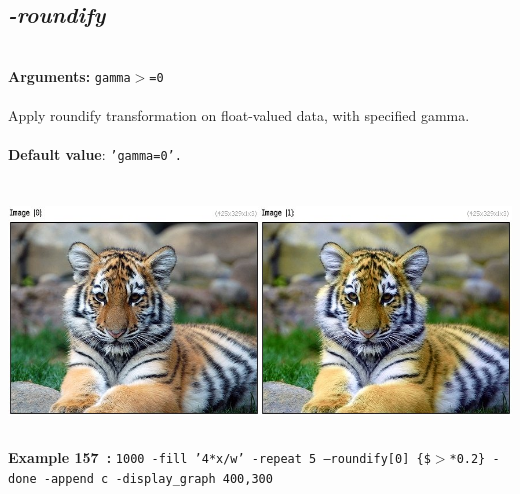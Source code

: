 \documentclass[a4paper,11pt,twoside]{book}
\begin{document}
\subsection{\emph{-roundify} }\vspace*{-0.5em}
~\\\textbf{Arguments: } 
{\small \texttt{gamma$>$=0}}\\~\\
Apply roundify transformation on float-valued data, with specified gamma.
~\\~\\\textbf{Default value}: {\small \texttt{'gamma=0'.}}
\begin{center}\includegraphics[keepaspectratio=true,height=7cm,width=\textwidth]{img/gmic_def157.jpg}\\
{\footnotesize \textbf{Example 157~:} \texttt{1000 -fill '4*x/w' -repeat 5 --roundify[0] \{\$$>$*0.2\} -done -append c -display\_graph 400,300}}
\end{center}
\end{document}
